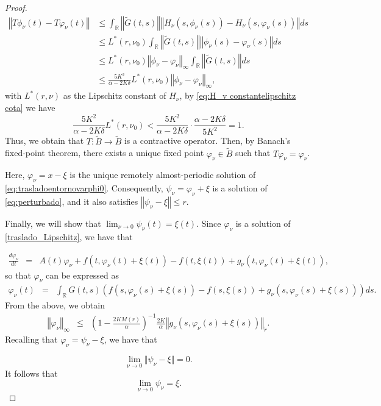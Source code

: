 \documentclass[english,reqno]{amsart}
\numberwithin{equation}{section}
\theoremstyle{plain}
\theoremstyle{definition}
\theoremstyle{remark}
\begin{document}
\begin{proof}
\begin{align*}
\left\Vert T\phi_{\nu}\left(t\right)-T\varphi_{\nu}\left(t\right)\right\Vert 
 & \leq\int_{\mathbb{R}}\left\Vert \tilde{G}\left(t,s\right)\right\Vert \left\Vert H_{\nu}\left(s,\phi_{\nu}\left(s\right)\right)-H_{\nu}\left(s,\varphi_{\nu}\left(s\right)\right)\right\Vert ds\\
 & \leq L^{*}\left(r,\nu_{0}\right)\int_{\mathbb{R}}\left\Vert \tilde{G}\left(t,s\right)\right\Vert \left\Vert \phi_{\nu}\left(s\right)-\varphi_{\nu}\left(s\right)\right\Vert ds\\
 & \leq L^{*}\left(r,\nu_{0}\right)\left\Vert \phi_{\nu}-\varphi_{\nu}\right\Vert_{\infty} \int_{\mathbb{R}}\left\Vert \tilde{G}\left(t,s\right)\right\Vert ds\\
 & \leq\frac{5K^{2}}{\alpha-2K\delta}L^{*}\left(r,\nu_{0}\right) \left\Vert \phi_{\nu}-\varphi_{\nu}\right\Vert_{\infty} ,
\end{align*}
with $L^{*}(r,\nu)$ as the Lipschitz constant of $H_{\nu}$, by \eqref{eq:H_v constantelipschitz cota} we have
\[
\frac{5K^{2}}{\alpha-2K\delta}L^{*}\left(r,\nu_{0}\right)<\frac{5K^{2}}{\alpha-2K\delta}\cdot\frac{\alpha-2K\delta}{5K^{2}}=1.
\]
Thus, we obtain that $T:\tilde{B}\rightarrow\tilde{B}$ is a contractive operator. Then, by Banach's fixed-point theorem, there exists a unique fixed point $\varphi_{\nu}\in\tilde{B}$ such that $T\varphi_{\nu}=\varphi_{\nu}$. 

Here, $\varphi_{\nu}=x-\xi$ is the unique remotely almost-periodic solution of \eqref{eq:trasladoentornovarphi0}. Consequently, $\psi_{\nu}=\varphi_{\nu}+\xi$ is a solution of \eqref{eq:perturbado}, and it also satisfies $\left\Vert \psi_{\nu}-\xi\right\Vert \leq r$.


Finally, we will show that $\lim_{\nu\rightarrow0}\psi_{\nu}\left(t\right)=\xi(t)$. Since $\varphi_\nu$ is a solution of \eqref{traslado_Lipschitz}, we have that

\begin{eqnarray*}
\frac{d\varphi_{\nu}}{dt}&=&A\left(t\right)\varphi_{\nu}+f\left(t,\varphi_{\nu}(t)+\xi\left(t\right)\right)-f\left(t,\xi\left(t\right)\right)+g_{\nu}\left(t,\varphi_{\nu}(t)+\xi\left(t\right)\right),
\end{eqnarray*}
so that $\varphi_{\nu}$ can be expressed as
\begin{eqnarray*}
\varphi_{\nu}(t)&=&\int_{\mathbb{R}}G(t,s)\left(f\left(s,\varphi_{\nu}(s)+\xi\left(s\right)\right)-f\left(s,\xi\left(s\right)\right)+g_{\nu}\left(s,\varphi_{\nu}(s)+\xi\left(s\right)\right)\right)ds.
\end{eqnarray*}
From the above, we obtain
\begin{eqnarray*}
\left\Vert \varphi_{\nu}\right\Vert _{\infty}&\leq&\left(1-\frac{2KM(r)}{\alpha}\right)^{-1}\frac{2K}{\alpha}\left\Vert g_{\nu}\left(s,\varphi_{\nu}(s)+\xi\left(s\right)\right)\right\Vert _{\tilde{r}}.
\end{eqnarray*}
Recalling that $\varphi_\nu=\psi_{\nu}-\xi$, we have that

 $$\lim_{\nu\rightarrow0}\Vert \psi_{\nu}-\xi\Vert=0.$$
It follows that
 $$\lim_{\nu\rightarrow0} \psi_{\nu}=\xi.$$
\end{proof}
\end{document}
